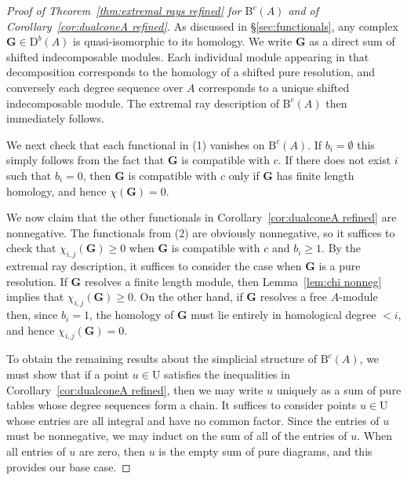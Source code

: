 \documentclass[12pt]{amsart}
\theoremstyle{definition}
\theoremstyle{remark}
\newcommand{\UU}{\mathrm{U}}
\newcommand{\cc}{c}
\newcommand{\Gbull}{\mathbf{G}}
\newcommand{\nothing}{\emptyset}
\newcommand{\DD}{\mathrm{D}}
\newcommand{\BBQ}{\mathrm{B}}
\begin{document}
\begin{proof}[Proof of Theorem~\ref{thm:extremal rays refined} for $\BBQ^{\cc}(A)$ and of Corollary~\ref{cor:dualconeA refined}]
As discussed in \S\ref{sec:functionals}, any complex $\Gbull\in \DD^b(A)$ is quasi-isomorphic to its homology.  We write $\Gbull$ as a direct sum of shifted indecomposable modules.  Each individual module appearing in that decomposition corresponds to the homology of a shifted pure resolution, and conversely each  degree sequence over $A$ corresponds to a unique shifted indecomposable module.  The extremal ray description of $\BBQ^{\cc}(A)$ then immediately follows.

We next check that each functional in (1) vanishes on $\BBQ^{\cc}(A)$.  If $b_i=\nothing$ this simply follows from the fact that $\Gbull$ is compatible with $\cc$.  If there does not exist $i$ such that $b_i=0$, then $\Gbull$ is compatible with $\cc$ only if $\Gbull$ has finite length homology, and hence $\chi(\Gbull)=0$.  

We now claim that the other functionals in Corollary~\ref{cor:dualconeA refined} are nonnegative.  The functionals from (2) are obviously nonnegative, so it suffices to check that $\chi_{i,j}(\Gbull)\geq 0$ when $\Gbull$ is compatible with $\cc$ and $b_i\geq 1$.  By the extremal ray description, it suffices to consider the case when $\Gbull$ is a pure resolution.  If $\Gbull$ resolves a finite length module, then Lemma~\ref{lem:chi nonneg} implies that $\chi_{i,j}(\Gbull)\geq 0$.  On the other hand, if $\Gbull$ resolves a free $A$-module then, since $b_i=1$, the homology of $\Gbull$ must lie entirely in homological degree $<i$, and hence $\chi_{i,j}(\Gbull)=0$.

To obtain the remaining results about the simplicial structure of $\BBQ^{\cc}(A)$, we must show that if a point $u\in \UU$ satisfies the inequalities in Corollary~\ref{cor:dualconeA refined}, then we may write $u$ uniquely as a sum of pure tables whose degree sequences form a chain.  It suffices to consider points $u\in \UU$ whose entries are all integral and have no common factor.  Since the entries of $u$ must be nonnegative, we may induct on the sum of all of the entries of $u$.  When all entries of $u$ are zero, then $u$ is the empty sum of pure diagrams, and this provides our base case.


\end{proof}
\end{document}
